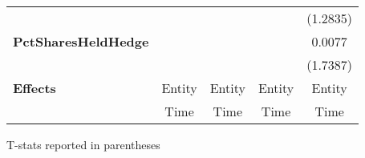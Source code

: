 \begin{center}
\begin{tabular}{lcccc}
\textbf{ }                                 &                     &                                &                     &             (1.2835)             \\
\textbf{PctSharesHeldHedge}                &                     &                                &                     &              0.0077              \\
\textbf{ }                                 &                     &                                &                     &             (1.7387)             \\
\midrule
\textbf{Effects}                           &        Entity       &             Entity             &        Entity       &              Entity              \\
& Time & Time & Time & Time\\
\bottomrule
\end{tabular}
\end{center}

T-stats reported in parentheses
